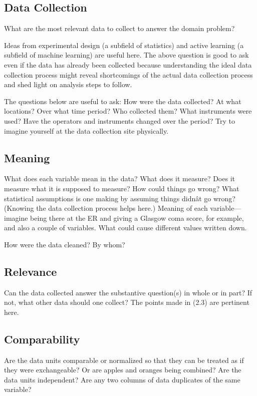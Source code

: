 \documentclass[10pt,letterpaper]{article}
\begin{document}
\subsection*{Data Collection}

What are the most relevant data to collect to answer the domain problem?

Ideas from experimental design (a subfield of statistics) and active learning (a subfield of machine learning) are useful here. The above question is good to ask even if the data has already been collected because understanding the ideal data collection process might reveal shortcomings of the actual data collection process and shed light on analysis steps to follow.

The questions below are useful to ask: How were the data collected? At what locations? Over what time period? Who collected them? What instruments were used? Have the operators and instruments changed over the period? Try to imagine yourself at the data collection site physically.

\subsection*{Meaning}

What does each variable mean in the data? What does it measure? Does it measure what it is supposed to measure? How could things go wrong? What statistical assumptions is one making by assuming things didnât go wrong? (Knowing the data collection process helps here.) Meaning of each variable---imagine being there at the ER and giving a Glasgow coma score, for example, and also a couple of variables. What could cause different values written down.

How were the data cleaned? By whom?

\subsection*{Relevance}

Can the data collected answer the substantive question(s) in whole or in part? If not, what other data should one collect? The points made in (2.3) are pertinent here.

\subsection*{Comparability}

Are the data units comparable or normalized so that they can be treated as if they were exchangeable? Or are apples and oranges being combined? Are the data units independent? Are any two columns of data duplicates of the same variable?
\end{document}
